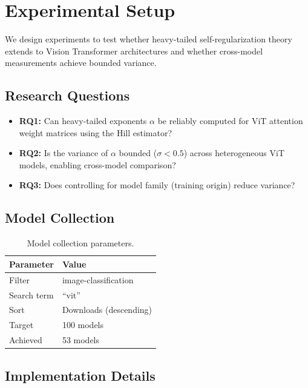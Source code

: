 \section{Experimental Setup}
\label{sec:experiments}

We design experiments to test whether heavy-tailed self-regularization theory extends to Vision Transformer architectures and whether cross-model measurements achieve bounded variance.

\subsection{Research Questions}

\begin{itemize}
    \item \textbf{RQ1:} Can heavy-tailed exponents $\alpha$ be reliably computed for ViT attention weight matrices using the Hill estimator?
    \item \textbf{RQ2:} Is the variance of $\alpha$ bounded ($\sigma < 0.5$) across heterogeneous ViT models, enabling cross-model comparison?
    \item \textbf{RQ3:} Does controlling for model family (training origin) reduce variance?
\end{itemize}

\subsection{Model Collection}

\begin{table}[h]
\centering
\begin{tabular}{ll}
\toprule
\textbf{Parameter} & \textbf{Value} \\
\midrule
Filter & image-classification \\
Search term & ``vit'' \\
Sort & Downloads (descending) \\
Target & 100 models \\
Achieved & 53 models \\
\bottomrule
\end{tabular}
\caption{Model collection parameters.}
\label{tab:collection}
\end{table}

\subsection{Implementation Details}

